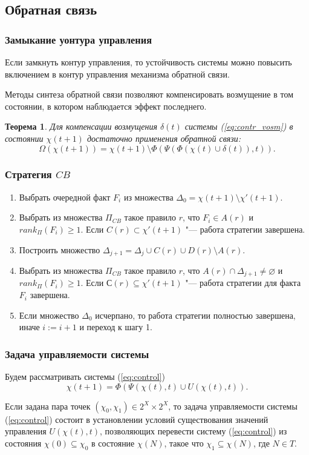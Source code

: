 \documentclass[default]{beamer}
\newtheorem{Theorem}{Теорема}
\begin{document}
	\subsection{Обратная связь}

	\begin{frame}
		\frametitle{Замыкание уонтура управления}
		
		Если замкнуть контур управления, то устойчивость системы можно повысить включением в контур управления механизма обратной связи.
		\par\bigskip
		Методы синтеза обратной связи позволяют компенсировать возмущение в том состоянии, в котором наблюдается эффект последнего.
		
		\begin{Theorem}
			Для компенсации возмущения $\delta(t)$ системы (\ref{eq:contr_vosm})  в состоянии $\chi(t+1)$ достаточно применения обратной связи:
			\begin{equation}
				\Omega(\chi(t+1)) = \chi(t+1) \setminus \Phi(\Psi(\Phi(\chi(t)\cup\delta(t)),t)).
			\end{equation}
		\end{Theorem}
	\end{frame}
	
	\begin{frame}
		\frametitle{Стратегия $CB$}
		
		\begin{enumerate}
			\item Выбрать очередной факт $F_i$ из множества  $\Delta_0 = \chi(t+1)\setminus\chi'(t+1)$.
			\item Выбрать из множества $\Pi_{CB}$ такое правило $r$, что $F_i\in A(r)$ и $rank_{\Pi}(F_i)\geqslant 1$. Если $C(r)\subset\chi'(t+1)$ "--- работа стратегии завершена.
			\item Построить множество $\Delta_{j+1} = \Delta_j \cup C(r)\cup D(r)\setminus A(r)$.
			\item Выбрать из множества $\Pi_{CB}$ такое правило $r$, что $A(r)\cap\Delta_{j+1}\not=\varnothing$ и $rank_{\Pi}(F_i)\geqslant 1$. Если $С(r)\subseteq\chi'(t+1)$ "--- работа стратегии для факта $F_i$ завершена.
			\item Если множество $\Delta_0$ исчерпано, то работа стратегии полностью завершена, иначе $i := i+1$ и переход к шагу 1.
		\end{enumerate}
	\end{frame}	
		
	\begin{frame}
		\frametitle{Задача управляемости системы}
		
		Будем рассматривать системы (\ref{eq:control})
		\[
		\chi(t+1)=\Phi(\Psi(\chi(t),t)\cup U(\chi(t),t)).
		\]
		\par\bigskip
		Если задана пара точек $(\chi_0, \chi_1)\in 2^X\times 2^X$, то задача управляемости системы (\ref*{eq:control}) состоит в установлении условий существования значений управления $U(\chi(t),t)$, позволяющих перевести систему (\ref*{eq:control}) из состояния $\chi(0)\subseteq\chi_0$ в состояние $\chi(N)$, такое что $\chi_1\subseteq\chi(N)$, где $N\in T$.
	\end{frame}
\end{document}
